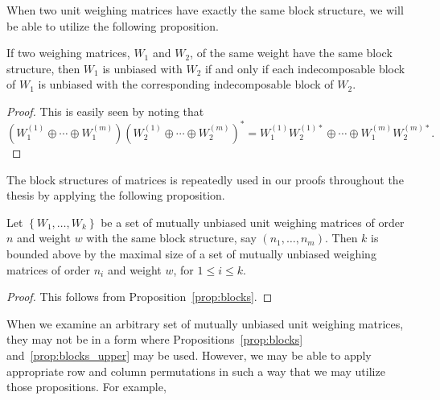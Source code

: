  When two unit weighing matrices have exactly the same block structure, we will be able to utilize the following proposition.

 \begin{proposition} \label{prop:blocks}
  If two weighing matrices, $W_1$ and $W_2$, of the same weight have the same block structure, then $W_1$ is unbiased with $W_2$ if and only if each indecomposable block of $W_1$ is unbiased with the corresponding indecomposable block of $W_2$.
  \begin{proof}
  This is easily seen by noting that $$(W_1^{(1)} \oplus \cdots \oplus W_1^{(m)})(W_2^{(1)} \oplus \cdots \oplus W_2^{(m)})^* = W_1^{(1)}W_2^{(1)*} \oplus \cdots \oplus W_1^{(m)}W_2^{(m)*}.$$
  \end{proof}
 \end{proposition}

  The block structures of matrices is repeatedly used in our proofs throughout the thesis by applying the following proposition.

 \begin{proposition} \label{prop:blocks_upper}
  Let $\left\{W_1,\dots,W_k\right\}$ be a set of mutually unbiased unit weighing matrices of order $n$ and weight $w$ with the same block structure, say $(n_1,\dots,n_m)$. Then $k$ is bounded above by the maximal size of a set of mutually unbiased weighing matrices of order $n_i$ and weight $w$, for $1 \leq i \leq k$.
  \begin{proof} This follows from Proposition~\ref{prop:blocks}.\end{proof}
 \end{proposition}

 When we examine an arbitrary set of mutually unbiased unit weighing matrices, they may not be in a form where Propositions~\ref{prop:blocks} and~\ref{prop:blocks_upper} may be used. However, we may be able to apply appropriate row and column permutations in such a way that we may utilize those propositions. For example,

